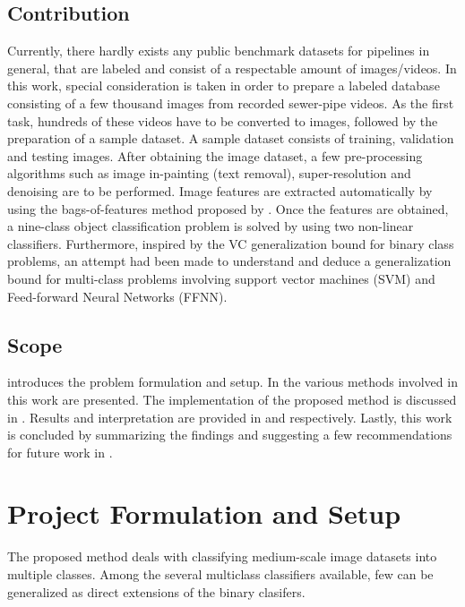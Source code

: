 \documentclass[letterpaper,12pt, onecolumn]{article}%
\begin{document}
\subsection{Contribution}
\noindent
Currently, there hardly exists any public benchmark datasets for pipelines in general, that are labeled and consist of a respectable amount of images/videos. In this work, special consideration is taken in order to prepare a labeled database consisting of a few thousand images from recorded sewer-pipe videos. As the first task, hundreds of these videos have to be converted to images, followed by the preparation of a sample dataset. A sample dataset consists of training, validation and testing images. After obtaining the image dataset, a few pre-processing algorithms such as image in-painting (text removal), super-resolution and denoising are to be performed.  Image features are extracted automatically by using the bags-of-features method proposed by \cite{csurka2004visual}. Once the features are obtained, a nine-class object classification problem is solved by using two non-linear classifiers. Furthermore, inspired by the VC generalization bound for binary class problems, an attempt had been made to understand and deduce a generalization bound for multi-class problems involving support vector machines (SVM) and Feed-forward Neural Networks (FFNN).


\subsection{Scope}
\noindent
{} introduces the problem formulation and setup. In  the various methods involved in this work are presented. The implementation of the proposed method is discussed in . Results and interpretation are provided in  and  respectively. Lastly, this work is concluded by summarizing the findings and suggesting a few recommendations for future work in .


\section{Project Formulation and Setup} \label{sec:project_setup}
\noindent
The proposed method deals with classifying medium-scale image datasets into multiple classes. Among the several multiclass classifiers available, few can be generalized as direct extensions of the binary clasifers. 
\end{document}
